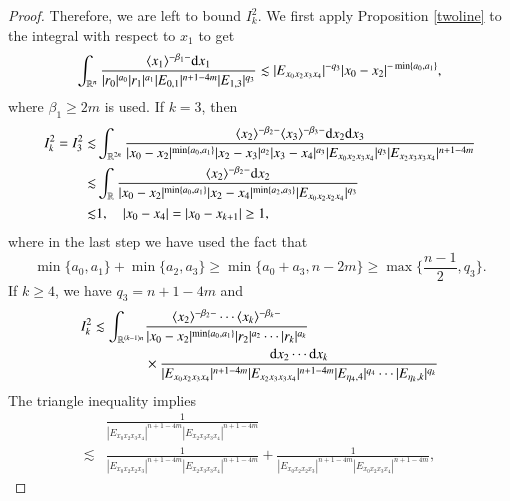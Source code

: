 \documentclass[11pt,reqno]{amsart}
\def\d{{\rm d}}
\numberwithin{equation}{section}
\theoremstyle{definition}
\begin{document}
\begin{proof}
	Therefore, we are left to bound $I_k^2$. We first apply Proposition \ref{twoline} to the integral with respect to $x_1$ to get
	\begin{equation*}
		\int_{\mathbb{R}^n}\frac{\langle x_1\rangle^{-\beta_1-}\d x_1}{|r_0|^{a_0}|r_1|^{a_1}|E_{0,1}|^{n+1-4m}|E_{1,3}|^{q_3}}\lesssim|E_{x_0x_2x_3x_4}|^{-q_3}|x_0-x_2|^{-\min\{a_0,a_1\}},
	\end{equation*}
	where $\beta_1\geq2m$ is used. If $k=3$, then
	\begin{equation*}
		\begin{split}
			I_k^2=I_3^2\lesssim&\int_{\mathbb{R}^{2n}}\frac{\langle x_2\rangle^{-\beta_2-}\langle x_3\rangle^{-\beta_3-}\d x_2\d x_3}{|x_0-x_2|^{\min\{a_0,a_1\}}|x_2-x_3|^{a_2}|x_3-x_4|^{a_3}|E_{x_0x_2x_3x_4}|^{q_3}|E_{x_2x_3x_3x_4}|^{n+1-4m}}\\
			\lesssim&\int_{\mathbb{R}}\frac{\langle x_2\rangle^{-\beta_2-}\d x_2}{|x_0-x_2|^{\min\{a_0,a_1\}}|x_2-x_4|^{\min\{a_2,a_3\}}|E_{x_0x_2x_2x_4}|^{q_3}}\\
			\lesssim&1,\quad|x_0-x_4|=|x_0-x_{k+1}|\geq1,
		\end{split}
	\end{equation*}
	where in the last step we have used the fact that
	\begin{equation*}
		\min\{a_0,a_1\}+\min\{a_2,a_3\}\geq\min\{a_0+a_3,n-2m\}\geq\max\{\mbox{$\frac{n-1}{2}$},q_3\}.
	\end{equation*}
	If $k\geq4$, we have $q_3=n+1-4m$ and
	\begin{equation}\label{Ikfinal}
		\begin{split}
			I_k^2\lesssim\int_{\mathbb{R}^{(k-1)n}}&\frac{\langle x_2\rangle^{-\beta_2-}\cdots\langle x_k\rangle^{-\beta_k-}}{|x_0-x_2|^{\min\{a_0,a_1\}}|r_2|^{a_2}\cdots|r_k|^{a_k}}\\
			&\times\frac{\d x_2\cdots \d x_k}{|E_{x_0x_2x_3x_4}|^{n+1-4m}|E_{x_2x_3x_3x_4}|^{n+1-4m}|E_{\eta_4,4}|^{q_4}\cdots|E_{\eta_k,k}|^{q_k}}
		\end{split}
	\end{equation}
	The triangle inequality implies
	\begin{equation}\label{triangle}
		\begin{split}
			&\frac{1}{|E_{x_0x_2x_3x_4}|^{n+1-4m}|E_{x_2x_3x_3x_4}|^{n+1-4m}}\\
			\lesssim&\frac{1}{|E_{x_0x_2x_2x_3}|^{n+1-4m}|E_{x_2x_3x_3x_4}|^{n+1-4m}}+\frac{1}{|E_{x_0x_2x_2x_3}|^{n+1-4m}|E_{x_0x_2x_3x_4}|^{n+1-4m}},
		\end{split}
	\end{equation}

\end{proof}
\end{document}
